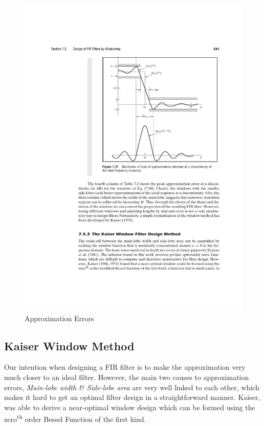 \documentclass[11pt]{article}
\begin{document}
\begin{figure}[H]
    \centering
    \includegraphics[scale=0.95]{window-char} 
    \caption{Approximation Errors \cite{oppenheim_schafer_2010}}
    \label{fig:errors}
\end{figure}

\subsection{Kaiser Window Method}

Our intention when designing a FIR filter is to make the approximation very much closer to an ideal filter. However, the main two causes to approximation errors, {\it Main-lobe width \& Side-lobe area} are very well linked to each other, which makes it hard to get an optimal filter design in a straightforward manner.
Kaiser, was able to derive a near-optimal window design which can be formed using the zero\textsuperscript{th} order Bessel Function of the first kind. 
\end{document}
